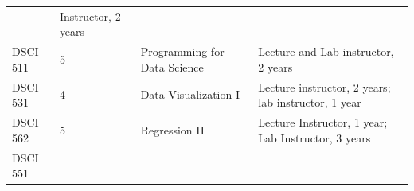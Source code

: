 \documentclass[]{article}
\begin{document}
\begin{longtable}[]{@{}llll@{}}
\begin{minipage}[t]{0.13\columnwidth}
\end{minipage} & \begin{minipage}[t]{0.25\columnwidth}\raggedright
Instructor, 2 years\strut
\end{minipage}\tabularnewline
\begin{minipage}[t]{0.21\columnwidth}\raggedright
DSCI 511\strut
\end{minipage} & \begin{minipage}[t]{0.29\columnwidth}\raggedright
5\strut
\end{minipage} & \begin{minipage}[t]{0.13\columnwidth}\raggedright
Programming for Data Science\strut
\end{minipage} & \begin{minipage}[t]{0.25\columnwidth}\raggedright
Lecture and Lab instructor, 2 years\strut
\end{minipage}\tabularnewline
\begin{minipage}[t]{0.21\columnwidth}\raggedright
DSCI 531\strut
\end{minipage} & \begin{minipage}[t]{0.29\columnwidth}\raggedright
4\strut
\end{minipage} & \begin{minipage}[t]{0.13\columnwidth}\raggedright
Data Visualization I\strut
\end{minipage} & \begin{minipage}[t]{0.25\columnwidth}\raggedright
Lecture instructor, 2 years; lab instructor, 1 year\strut
\end{minipage}\tabularnewline
\begin{minipage}[t]{0.21\columnwidth}\raggedright
DSCI 562\strut
\end{minipage} & \begin{minipage}[t]{0.29\columnwidth}\raggedright
5\strut
\end{minipage} & \begin{minipage}[t]{0.13\columnwidth}\raggedright
Regression II\strut
\end{minipage} & \begin{minipage}[t]{0.25\columnwidth}\raggedright
Lecture Instructor, 1 year; Lab Instructor, 3 years\strut
\end{minipage}\tabularnewline
\begin{minipage}[t]{0.21\columnwidth}\raggedright
DSCI 551\strut
\end{minipage} & \begin{minipage}[t]{0.29\columnwidth}\raggedright

\end{minipage}
\end{longtable}
\end{document}
